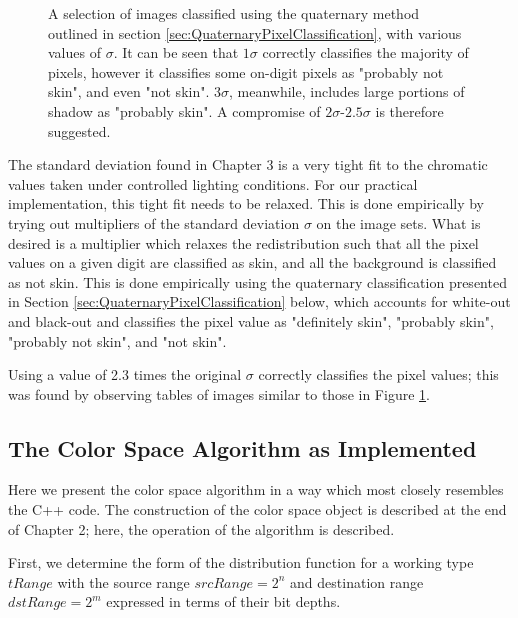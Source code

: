 {\begin{figure}[h!]
      \caption{A selection of images classified using the quaternary method outlined in section \ref{sec:QuaternaryPixelClassification}, with various values of $\sigma$. It can be seen that $1\sigma$ correctly classifies the majority of pixels, however it classifies some on-digit pixels as "probably not skin", and even "not skin". $3\sigma$, meanwhile, includes large portions of shadow as "probably skin". A compromise of $2\sigma$-$2.5\sigma$ is therefore suggested.} \label{fig:RelaxedSigma}
  \end{figure}
  \clearpage
  }
  
  The standard deviation found in Chapter 3 is a very tight fit to the chromatic values taken under controlled lighting conditions. For our practical implementation, this tight fit needs to be relaxed. This is done empirically by trying out multipliers of the standard deviation $\sigma$ on the image sets. What is desired is a multiplier which relaxes the redistribution such that all the pixel values on a given digit are classified as skin, and all the background is classified as not skin. This is done empirically using the quaternary classification presented in Section \ref{sec:QuaternaryPixelClassification} below, which accounts for white-out and black-out and classifies the pixel value as "definitely skin", "probably skin", "probably not skin", and "not skin".
  
  Using a value of 2.3 times the original $\sigma$ correctly classifies the pixel values; this was found by observing tables of images similar to those in Figure \ref{fig:RelaxedSigma}. 
  
  
  \subsection{The Color Space Algorithm as Implemented}\label{sec:ColorSpaceAlgorithmAsImplemented}
  Here we present the color space algorithm in a way which most closely resembles the C++ code. The construction of the color space object is described at the end of Chapter 2; here, the operation of the algorithm is described.
  
  First, we determine the form of the distribution function for a working type $tRange$ with the source range $srcRange=2^n$  and destination range $dstRange=2^m$ expressed in terms of their bit depths.
  
